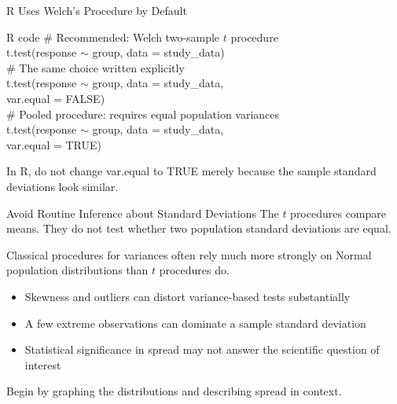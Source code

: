 \documentclass[aspectratio=169,10pt]{beamer}
\begin{document}
\begin{frame}{R Uses Welch's Procedure by Default}
\begin{block}{R code}
\scriptsize\sffamily
\textcolor{CourseGreen}{\# Recommended: Welch two-sample $t$ procedure} \\
t.test(response $\sim$ group, data = study\_data) \\
\vspace{0.08cm}
\textcolor{CourseGreen}{\# The same choice written explicitly} \\
t.test(response $\sim$ group, data = study\_data, \\
\hspace*{1.1cm}var.equal = FALSE) \\
\vspace{0.08cm}
\textcolor{CourseGreen}{\# Pooled procedure: requires equal population variances} \\
t.test(response $\sim$ group, data = study\_data, \\
\hspace*{1.1cm}var.equal = TRUE)
\end{block}

In R, do not change \textsf{var.equal} to \textsf{TRUE} merely because the sample standard deviations look similar.
\end{frame}

\begin{frame}{Avoid Routine Inference about Standard Deviations}
The $t$ procedures compare means. They do not test whether two population standard deviations are equal.

Classical procedures for variances often rely much more strongly on Normal population distributions than $t$ procedures do.

\begin{itemize}
  \item Skewness and outliers can distort variance-based tests substantially
  \item A few extreme observations can dominate a sample standard deviation
  \item Statistical significance in spread may not answer the scientific question of interest
\end{itemize}

Begin by graphing the distributions and describing spread in context.
\end{frame}
\end{document}

